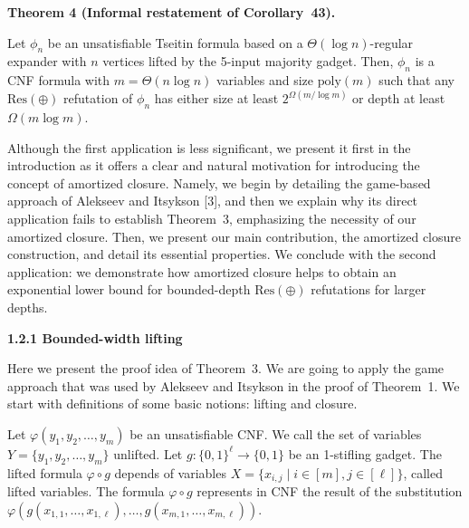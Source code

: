 \par\medskip\noindent\textbf{
Theorem 4 (Informal restatement of Corollary 43).
}\par



Let $\phi_{n}$ be an unsatisfiable Tseitin formula based on a $\Theta(\log n)$-regular expander with $n$ vertices lifted by the 5-input majority gadget. Then, $\phi_{n}$ is a CNF formula with $m=\Theta(n\log n)$ variables and size $\mathrm{poly}(m)$ such that any $\mathrm{Res}(\oplus)$ refutation of $\phi_{n}$ has either size at least $2^{\Omega(m/\log m)}$ or depth at least $\Omega(m\log m)$.\par




Although the first application is less significant, we present it first in the introduction as it offers a clear and natural motivation for introducing the concept of amortized closure.
Namely, we begin by detailing the game-based approach of Alekseev and Itsykson [3], and then we explain why its direct application fails to establish Theorem 3, emphasizing the necessity of our amortized closure. Then, we present our main contribution, the amortized closure construction, and detail its essential properties. We conclude with the second application: we demonstrate how amortized closure helps to obtain an exponential lower bound for bounded-depth $\mathrm{Res}(\oplus)$ refutations for larger depths.\par


\par\medskip\noindent\textbf{
1.2.1 Bounded-width lifting}\par


Here we present the proof idea of Theorem 3. We are going to apply the game approach that was used by Alekseev and Itsykson in the proof of Theorem 1. We start with definitions of some basic notions: lifting and closure.\par



Let $\varphi(y_{1},y_{2},\dots,y_{m})$ be an unsatisfiable CNF. We call the set of variables
$Y=\{y_{1},y_{2},\dots,y_{m}\}$ unlifted. Let $g\colon\{0,1\}^{\ell}\to\{0,1\}$ be an 1-stifling gadget. The lifted formula $\varphi\circ g$ depends of variables $X=\{x_{i,j}\mid i\in[m],j\in[\ell]\}$, called lifted variables. The formula $\varphi\circ g$ represents in CNF the result of the substitution $\varphi(g(x_{1,1},\dots,x_{1,\ell}),\dots,g(x_{m,1},\dots,x_{m,\ell}))$.\par


